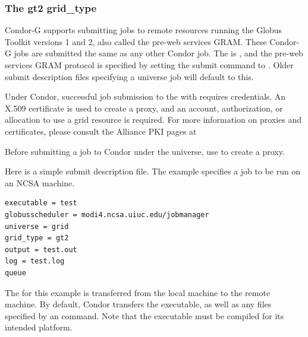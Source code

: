 \subsubsection{\label{sec:Using-gt2}The gt2 grid\_type}

Condor-G supports submitting jobs to remote resources running
the Globus Toolkit versions 1 and 2, also called the pre-web
services GRAM.
These Condor-G jobs are submitted the same as any other Condor job.
The  is ,
and the pre-web services GRAM protocol is specified by
setting the submit command  to .
Older submit description files specifying a  universe job
will default to this.

Under Condor, successful job submission to the  
 with 
requires credentials.
An X.509 certificate is used to create a proxy,
and an account, authorization, or allocation to use a grid resource
is required.
For more information on proxies and certificates,
please consult the Alliance PKI pages at 


Before submitting a job to Condor under the  universe,
use  to create a proxy.

Here is a simple submit description file.
The example specifies a  job to be run on
an NCSA machine.

\begin{verbatim}
executable = test
globusscheduler = modi4.ncsa.uiuc.edu/jobmanager
universe = grid
grid_type = gt2
output = test.out
log = test.log
queue
\end{verbatim} 

The 
for this example is
transferred from the local machine to the remote machine.
By default, Condor transfers the executable, as well as any
files specified by an  command.
Note that the executable must be compiled for its intended platform.

